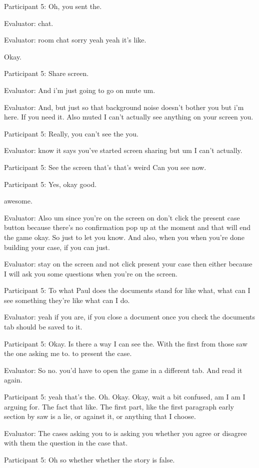 \documentclass{l4proj}
\begin{document}
\begin{appendices}
Participant 5: Oh, you sent the.

Evaluator: chat.

Evaluator: room chat sorry yeah yeah it's like.

Okay.

Participant 5: Share screen.

Evaluator: And i'm just going to go on mute um.

Evaluator: And, but just so that background noise doesn't bother you but i'm here. If you need it. Also muted I can't actually see anything on your screen you.

Participant 5: Really, you can't see the you.

Evaluator: know it says you've started screen sharing but um I can't actually.

Participant 5: See the screen that's that's weird Can you see now.

Participant 5: Yes, okay good.

awesome.

Evaluator: Also um since you're on the screen on don't click the present case button because there's no confirmation pop up at the moment and that will end the game okay. So just to let you know. And also, when you when you're done building your case, if you can just.

Evaluator: stay on the screen and not click present your case then either because I will ask you some questions when you're on the screen.

Participant 5: To what Paul does the documents stand for like what, what can I see something they're like what can I do.

Evaluator: yeah if you are, if you close a document once you check the documents tab should be saved to it.

Participant 5: Okay. Is there a way I can see the. With the first from those saw the one asking me to. to present the case.

Evaluator: So no. you'd have to open the game in a different tab. And read it again.

Participant 5: yeah that's the. Oh. Okay. Okay, wait a bit confused, am I am I arguing for. The fact that like. The first part, like the first paragraph early section by saw is a lie, or against it, or anything that I choose.

Evaluator: The cases asking you to is asking you whether you agree or disagree with them the question in the case that.

Participant 5: Oh so whether whether the story is false.


\end{appendices}
\end{document}
